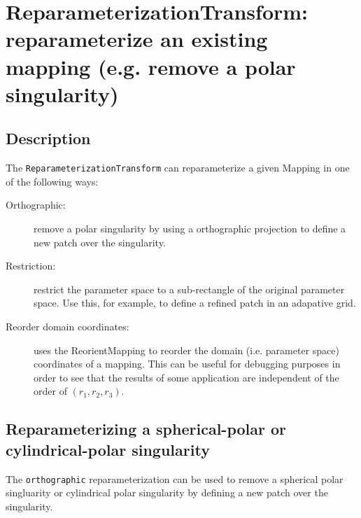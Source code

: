 \section{ReparameterizationTransform: reparameterize an existing mapping 
(e.g. remove a polar singularity)}

\subsection{Description}

The {\tt ReparameterizationTransform} can reparameterize a given Mapping
in one of the following ways:
\begin{description}
   \item[Orthographic:] remove a polar singularity by using a orthographic projection
      to define a new patch over the singularity.
   \item[Restriction:] restrict the parameter space to a sub-rectangle of the
       original parameter space. Use this, for example, to define a refined patch in an
       adapative grid.
   \item[Reorder domain coordinates:] uses the ReorientMapping to reorder the domain (i.e. parameter space)
     coordinates of a mapping. This can be useful for debugging purposes in order to see that
     the results of some application are independent of the order of $(r_1,r_2,r_3)$.
\end{description}   


\subsection{Reparameterizing a spherical-polar or cylindrical-polar singularity}

  The {\tt orthographic} reparameterization can be used to remove a spherical polar
singluarity or cylindrical polar singularity by defining a new patch over the singularity. 


